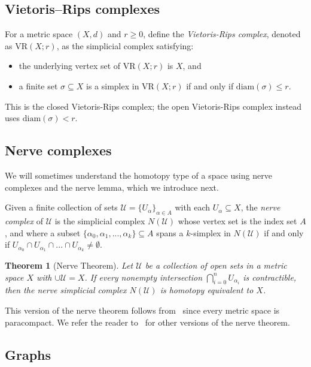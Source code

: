 \documentclass[12pt,a4paper]{amsart}
\newtheorem{theorem}{Theorem}[section]
\theoremstyle{definition}
\newcommand{\cU}{\ensuremath{\mathcal{U}}}
\newcommand{\vr}[2]{\mathrm{VR}(#1;#2)}
\newcommand{\diam}{\ensuremath{\mathrm{diam}}}
\numberwithin{equation}{section}
\begin{document}
\subsection{Vietoris--Rips complexes}

For a metric space $(X,d)$ and $r\geq 0$, define the \emph{Vietoris-Rips complex}, denoted as $\vr{X}{r}$, as the simplicial complex satisfying:
\begin{itemize}
\item the underlying vertex set of $\vr{X}{r}$ is $X$, and
\item a finite set $\sigma\subseteq X$ is a simplex in $\vr{X}{r}$ if and only if $\diam(\sigma) \leq r$.
\end{itemize}
This is the closed Vietoris-Rips complex; the open Vietoris-Rips complex instead uses $\diam(\sigma)<r$.



\subsection{Nerve complexes}

We will sometimes understand the homotopy type of a space using nerve complexes and the nerve lemma, which we introduce next.

Given a finite collection of sets $\cU=\{U_{\alpha}\}_{\alpha\in A}$ with each $U_\alpha\subseteq X$,
the \emph{nerve complex} of $\cU$ is the simplicial complex $N(\cU)$ 
whose vertex set is the index set $A$, and where a subset $\{\alpha_{0},\alpha_{1},...,\alpha_{k}\}\subseteq A$ spans a $k$-simplex in $N(\cU)$  if and only if $U_{\alpha_{0} }\cap U_{\alpha_{1} }\cap ...\cap U_{\alpha_{k} }\neq\emptyset$.

\begin{theorem}[Nerve Theorem]
\label{thm:nerve}
Let $\cU$ be a collection of open sets in a metric space $X$ with $\cup \cU = X$.
If every nonempty intersection $\bigcap^{n}_{i=0} U_{\alpha_{i}}$ is contractible, then the nerve simplicial complex $N(\cU)$ is homotopy equivalent to $X$.
\end{theorem}

This version of the nerve theorem follows from~\cite[Corollary~4G.3]{Hatcher} since every metric space is paracompact.
We refer the reader to~\cite{Borsuk1948,Bjorner1995} for other versions of the nerve theorem.


\subsection{Graphs}
\label{ssec:graphs}
\end{document}
